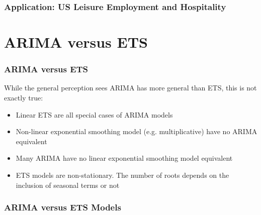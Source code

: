 \documentclass{beamer}
\begin{document}
\begin{frame}
  \frametitle{Application:  US Leisure Employment and Hospitality}
\end{frame}


\section{ARIMA versus ETS}


\begin{frame}
  \frametitle{ARIMA versus ETS}
  While the general perception sees ARIMA has more general than ETS, this is not exactly true:

  \begin{itemize}
  \item Linear ETS are all special cases of ARIMA models
  \item Non-linear exponential smoothing model (e.g. multiplicative) have no ARIMA equivalent
  \item Many ARIMA have no linear exponential smoothing model equivalent
  \item ETS models are non-stationary. The number of roots depends on the inclusion of seasonal terms or not
  \end{itemize}
\end{frame}



\begin{frame}
  \frametitle{ARIMA versus ETS Models}
\end{frame}
\end{document}
